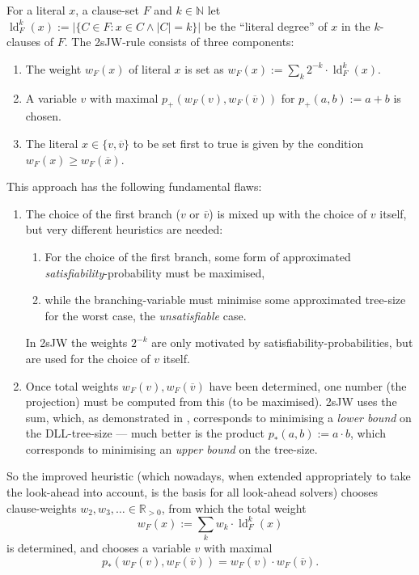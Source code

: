 \documentclass[final,3p,times]{elsarticle}
\theoremstyle{definition}
\newcommand{\set}[1]{\{#1\}}
\newcommand{\ol}{\overline}
\newcommand{\NN}{\mathbb{N}}
\newcommand{\RR}{\mathbb{R}}
\providecommand{\abs}[1]{\lvert #1 \rvert}
\DeclareMathOperator{\ldeg}{ld} %
\begin{document}
For a literal $x$, a clause-set $F$ and $k \in \NN$ let $\ldeg_F^k(x) := \abs{\set{C \in F : x \in C \wedge \abs{C} = k}}$ be the ``literal degree'' of $x$ in the $k$-clauses of $F$. The 2sJW-rule consists of three components:
\begin{enumerate}
\item The weight $w_F(x)$ of literal $x$ is set as $w_F(x) := \sum_k 2^{-k} \cdot \ldeg_F^k(x)$.
\item A variable $v$ with maximal $p_+(w_F(v), w_F(\ol{v}))$ for $p_+(a,b) := a+b$ is chosen.
\item The literal $x \in \set{v,\ol{v}}$ to be set first to true is given by the condition $w_F(x) \ge w_F(\ol{x})$.
\end{enumerate}
This approach has the following fundamental flaws:
\begin{enumerate}
\item The choice of the first branch ($v$ or $\ol{v}$) is mixed up with the choice of $v$ itself, but very different heuristics are needed:
  \begin{enumerate}
  \item For the choice of the first branch, some form of approximated \emph{satisfiability}-probability must be maximised,
  \item while the branching-variable must minimise some approximated tree-size for the worst case, the \emph{unsatisfiable} case.
  \end{enumerate}
  In 2sJW the weights $2^{-k}$ are only motivated by satisfiability-probabilities, but are used for the choice of $v$ itself.
\item Once total weights $w_F(v), w_F(\ol{v})$ have been determined, one number (the projection) must be computed from this (to be maximised). 2sJW uses the sum, which, as demonstrated in \cite{Kullmann2007HandbuchTau}, corresponds to minimising a \emph{lower bound} on the DLL-tree-size --- much better is the product $p_*(a,b) := a \cdot b$, which corresponds to minimising an \emph{upper bound} on the tree-size.
\end{enumerate}
So the improved heuristic (which nowadays, when extended appropriately to take the look-ahead into account, is the basis for all look-ahead solvers) chooses clause-weights $w_2, w_3, \dots \in \RR_{>0}$, from which the total weight
\begin{displaymath}
 w_F(x) := \sum_k w_k \cdot \ldeg_F^k(x)
\end{displaymath}
is determined, and chooses a variable $v$ with maximal
\begin{displaymath}
  p_*(w_F(v), w_F(\ol{v})) = w_F(v) \cdot w_F(\ol{v}).
\end{displaymath}
\end{document}
